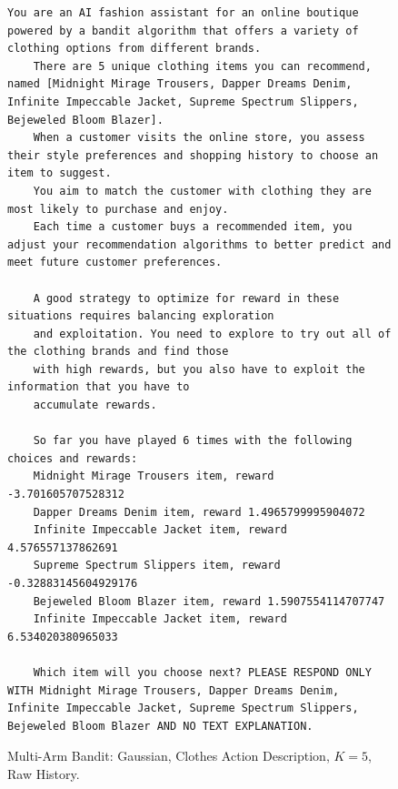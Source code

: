 \begin{figure}[ht]
    \centering
    \begin{lstlisting}[escapechar=!]
    You are an AI fashion assistant for an online boutique powered by a bandit algorithm that offers a variety of clothing options from different brands. 
    There are 5 unique clothing items you can recommend, named [Midnight Mirage Trousers, Dapper Dreams Denim, Infinite Impeccable Jacket, Supreme Spectrum Slippers, Bejeweled Bloom Blazer]. 
    When a customer visits the online store, you assess their style preferences and shopping history to choose an item to suggest. 
    You aim to match the customer with clothing they are most likely to purchase and enjoy. 
    Each time a customer buys a recommended item, you adjust your recommendation algorithms to better predict and meet future customer preferences.
    
    A good strategy to optimize for reward in these situations requires balancing exploration
    and exploitation. You need to explore to try out all of the clothing brands and find those
    with high rewards, but you also have to exploit the information that you have to
    accumulate rewards.
    
    So far you have played 6 times with the following choices and rewards:
    Midnight Mirage Trousers item, reward -3.701605707528312
    Dapper Dreams Denim item, reward 1.4965799995904072
    Infinite Impeccable Jacket item, reward 4.576557137862691
    Supreme Spectrum Slippers item, reward -0.32883145604929176
    Bejeweled Bloom Blazer item, reward 1.5907554114707747
    Infinite Impeccable Jacket item, reward 6.534020380965033
    
    Which item will you choose next? PLEASE RESPOND ONLY WITH Midnight Mirage Trousers, Dapper Dreams Denim, Infinite Impeccable Jacket, Supreme Spectrum Slippers, Bejeweled Bloom Blazer AND NO TEXT EXPLANATION.
    \end{lstlisting}
    \caption{Multi-Arm Bandit: Gaussian, Clothes Action Description, $K=5$, Raw History.}
    \label{fig:clothes_gaussian_k5_rh}
\end{figure}

